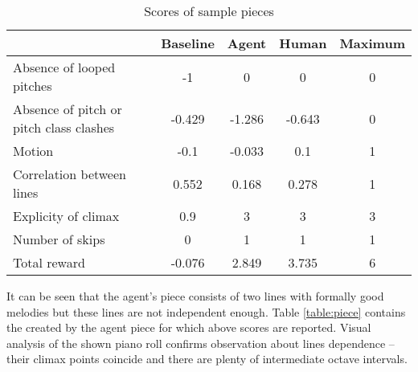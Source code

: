 \documentclass{article}
\begin{document}
\begin{table}[h!]
	\caption{Scores of sample pieces}
	\label{table:scores}
	\begin{center}
		\begin{tabular}{|l|c|c|c|c|}
			\hline
			& Baseline & Agent & Human & Maximum\\
			\hline
			Absence of looped pitches & -1 & 0 & 0 & 0\\
			\hline
			Absence of pitch or pitch class clashes & -0.429 & -1.286 & -0.643 & 0\\
			\hline
			Motion & -0.1 & -0.033 & 0.1 & 1\\
			\hline
			Correlation between lines & 0.552 & 0.168 & 0.278 & 1\\
			\hline
			Explicity of climax & 0.9 & 3 & 3 & 3\\
			\hline
			Number of skips & 0 & 1 & 1 & 1\\
			\hline
			Total reward & -0.076 & 2.849 & 3.735 & 6\\
			\hline
		\end{tabular}
	\end{center}
\end{table}

It can be seen that the agent's piece consists of two lines with formally good melodies but these lines are not independent enough. Table \ref{table:piece} contains the created by the agent piece for which above scores are reported. Visual analysis of the shown piano roll confirms observation about lines dependence -- their climax points coincide and there are plenty of intermediate octave intervals.
\end{document}

